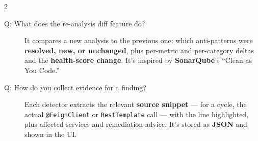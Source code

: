 \documentclass[10pt,a4paper]{article}
\begin{document}
\begin{multicols}{2}
\begin{description}


    \item[Q: What does the re-analysis diff feature do?]
    It compares a new analysis to the previous one: which anti-patterns were \textbf{resolved, new, or unchanged}, plus per-metric and per-category deltas and the \textbf{health-score change}. It's inspired by \textbf{SonarQube}'s ``Clean as You Code.''

    \item[Q: How do you collect evidence for a finding?]
    Each detector extracts the relevant \textbf{source snippet} --- for a cycle, the actual \texttt{@FeignClient} or \texttt{RestTemplate} call --- with the line highlighted, plus affected services and remediation advice. It's stored as \textbf{JSON} and shown in the UI.
\end{description}






\end{multicols}
\end{document}
